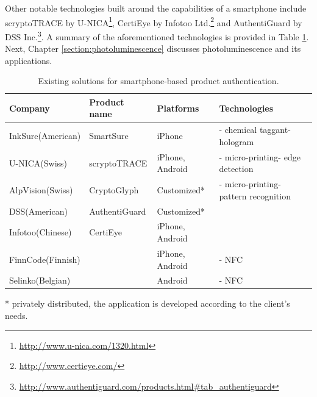 \documentclass[thesis.tex]{subfiles}
\begin{document}
Other notable technologies built around the capabilities of a smartphone include scryptoTRACE\textregistered{} by U-NICA\footnote{\url{http://www.u-nica.com/1320.html}}, CertiEye by Infotoo Ltd.\footnote{\url{http://www.certieye.com/}} and AuthentiGuard by DSS Inc.\footnote{\url{http://www.authentiguard.com/products.html\#tab_authentiguard}}. A summary of the aforementioned technologies is provided in Table \ref{table:existing-solutions}. Next, Chapter \ref{section:photoluminescence} discusses photoluminescence and its applications.

\begin{table}[hb]
	\caption{Existing solutions for smartphone-based product authentication.} \label{table:existing-solutions}

	\begin{center}
	\begin{tabular}{| m{2cm} | m{3.25cm} | m{3cm} | m{3.75cm} |}

		\hline
		\textbf{Company}				&	\textbf{Product name}			&	\textbf{Platforms}			&	\textbf{Technologies} \\ \hline
		InkSure\newline (American)		&	SmartSure						&	iPhone						&	- chemical taggant\newline- hologram \\ \hline
		U-NICA\newline (Swiss)			&	scryptoTRACE\textregistered		&	iPhone, Android				&	- micro-printing\newline- edge detection \\ \hline
		AlpVision\newline (Swiss)		&	CryptoGlyph\textregistered		&	Customized\footnotesize{*}	&	- micro-printing\newline- pattern recognition \\ \hline
		DSS\newline (American)			&	AuthentiGuard					&	Customized\footnotesize{*}	&	 \\ \hline
		Infotoo\newline (Chinese)		&	CertiEye						&	iPhone, Android				&	 \\ \hline
		FinnCode\newline (Finnish)		&									&	iPhone, Android				&	- NFC \\ \hline
		Selinko\newline (Belgian)		&									&	Android						&	- NFC \\
		\hline
	\end{tabular}
	\end{center}
	\scriptsize{*} \small{privately distributed, the application is developed according to the client's needs.}
\end{table}
\end{document}
